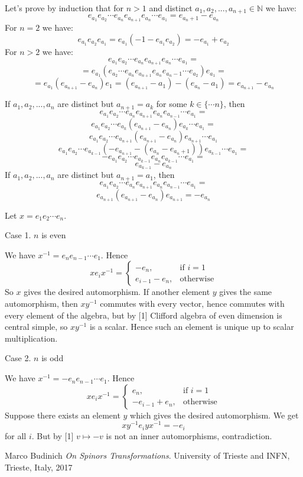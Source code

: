 \documentclass[a4paper]{article}
\begin{document}
Let's prove by induction that for $n>1$ and distinct $a_1, a_2, ..., a_{n+1} \in \mathbb{N}$ we have:
$$e_{a_1} e_{a_2} \cdots e_{a_n} e_{a_{n+1}} e_{a_n} \cdots e_{a_1}= e_{a_n+1}-e_{a_{n}}$$
For $n=2$ we have:
$$e_{a_1} e_{a_2} e_{a_1} = e_{a_1} (-1-e_{a_1} e_{a_2}) = -e_{a_1} + e_{a_2}$$
For $n>2$ we have:
$$e_{a_1} e_{a_2} \cdots e_{a_n} e_{a_{n+1}} e_{a_n}  \cdots e_{a_1} =$$
$$= e_{a_1} (e_{a_2} \cdots e_{a_n} e_{a_{n+1}} e_{a_n} e_{a_n-1} \cdots e_{a_2}) e_{a_1}=$$
$$ = e_{a_1} ( e_{a_{n+1}}-e_{a_{n}}) e_1 = 
(e_{a_{n+1}} - a_1)-(e_{a_{n}} - a_1) = e_{a_{n+1}}-e_{a_{n}}$$

If $a_1, a_2, ..., a_{n}$ are distinct but $a_{n+1} = a_k$ for some $k \in \{\cdots n\}$, then
$$e_{a_1} e_{a_2} \cdots e_{a_n} e_{a_{n+1}} e_{a_n} e_{a_{n-1}} \cdots e_{a_1} =$$
$$e_{a_1} e_{a_2} \cdots e_{a_k} (e_{a_{n+1}} - e_{a_n}) e_{a_k} \cdots e_{a_1} =$$
$$e_{a_1} e_{a_2} \cdots e_{a_{n+1}} (e_{a_{n+1}} - e_{a_n}) e_{a_{n+1}} \cdots e_{a_1}$$
$$e_{a_1} e_{a_2} \cdots e_{a_{k-1}} (-e_{a_{n+1}} - (e_{a_n} - e_{a_n+1})) e_{a_{k-1}} \cdots e_{a_1}=$$
$$-e_{a_1} e_{a_2} \cdots e_{a_{k-1}} e_{a_n} e_{a_{k-1}} \cdots e_{a_1}=$$
$$e_{a_{k-1}}- e_{a_n}$$
If $a_1, a_2, ..., a_{n}$ are distinct but $a_{n+1} = a_1$, then
$$e_{a_1} e_{a_2} \cdots e_{a_n} e_{a_{n+1}} e_{a_n} e_{a_{n-1}} \cdots e_{a_1} =$$
$$e_{a_{n+1}} (e_{a_{n+1}} - e_{a_n}) e_{a_{n+1}} = -e_{a_n}$$

Let $x = e_1 e_2 \cdots e_n$.

Case 1. $n$ is even

We have $x^{-1} = e_n e_{n-1} \cdots e_1$. Hence
\[x e_i x^{-1} = \begin{cases}
		-e_n,& \text{if } i = 1\\
		e_{i-1} - e_n,   & \text{otherwise}
\end{cases}
\]
So $x$ gives the desired automorphism. If another element $y$ gives the same automorphism, then $xy^{-1}$ commutes with every vector, hence commutes with every element of the algebra, but by [1] Clifford algebra of even dimension is central simple, so $x y^{-1}$ is a scalar. Hence such an element is unique up to scalar multiplication.

Case 2. $n$ is odd

We have $x^{-1} = -e_n e_{n-1} \cdots e_1$. Hence
\[x e_i x^{-1} = \begin{cases}
e_n,& \text{if } i = 1\\
-e_{i-1} + e_n,   & \text{otherwise}
\end{cases}
\]
Suppose there exists an element $y$ which gives the desired automorphism. 
We get
$$x y^{-1} e_i y x^{-1} = -e_i$$ for all $i$.
But by [1] $v \mapsto -v$ is not an inner automorphisms, contradiction.

\begin{thebibliography}{9}
	Marco Budinich
	\textit{On Spinors Transformations}. 
University of Trieste and INFN, Trieste, Italy, 2017
\end{thebibliography}
\end{document}
